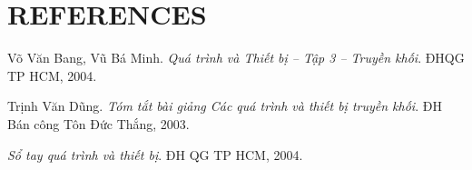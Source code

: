 \section{REFERENCES}

\begin{enumerate}[label={[\arabic*]}]
    \item Võ Văn Bang, Vũ Bá Minh. \textit{Quá trình và Thiết bị -- Tập 3 -- Truyền khối}. ĐHQG TP HCM, 2004.
    \item Trịnh Văn Dũng. \textit{Tóm tắt bài giảng Các quá trình và thiết bị truyền khối}. ĐH Bán công Tôn Đức Thắng, 2003.
    \item \textit{Sổ tay quá trình và thiết bị}. ĐH QG TP HCM, 2004.
\end{enumerate}
